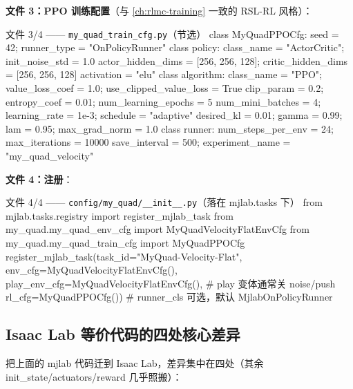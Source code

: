 \textbf{文件 3：PPO 训练配置}（与 \cref{ch:rlmc-training} 一致的 RSL-RL 风格）：

\begin{codebox}[Python]{文件 3/4 —— \texttt{my\_quad\_train\_cfg.\allowbreak py}（节选）}
class MyQuadPPOCfg:
    seed = 42; runner_type = "OnPolicyRunner"
    class policy:
        class_name = "ActorCritic"; init_noise_std = 1.0
        actor_hidden_dims = [256, 256, 128]; critic_hidden_dims = [256, 256, 128]
        activation = "elu"
    class algorithm:
        class_name = "PPO"; value_loss_coef = 1.0; use_clipped_value_loss = True
        clip_param = 0.2; entropy_coef = 0.01; num_learning_epochs = 5
        num_mini_batches = 4; learning_rate = 1e-3; schedule = "adaptive"
        desired_kl = 0.01; gamma = 0.99; lam = 0.95; max_grad_norm = 1.0
    class runner:
        num_steps_per_env = 24; max_iterations = 10000
        save_interval = 500; experiment_name = "my_quad_velocity"
\end{codebox}

\textbf{文件 4：注册}：

\begin{codebox}[Python]{文件 4/4 —— \texttt{config/\allowbreak my\_quad/\allowbreak \_\_init\_\_.\allowbreak py}（落在 mjlab.tasks 下）}
from mjlab.tasks.registry import register_mjlab_task
from my_quad.my_quad_env_cfg import MyQuadVelocityFlatEnvCfg
from my_quad.my_quad_train_cfg import MyQuadPPOCfg
register_mjlab_task(task_id="MyQuad-Velocity-Flat",
    env_cfg=MyQuadVelocityFlatEnvCfg(),
    play_env_cfg=MyQuadVelocityFlatEnvCfg(),   # play 变体通常关 noise/push
    rl_cfg=MyQuadPPOCfg())                      # runner_cls 可选，默认 MjlabOnPolicyRunner
\end{codebox}

\subsection{Isaac Lab 等价代码的四处核心差异}
\label{sec:rlmc-diy-fullcode-isaac}

把上面的 mjlab 代码迁到 Isaac Lab，差异集中在四处（其余 init\_state/actuators/reward 几乎照搬）：

